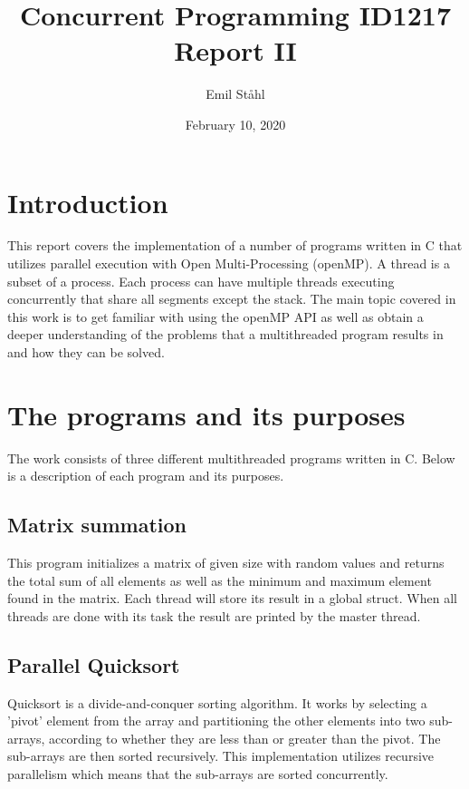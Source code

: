 \documentclass{article}
\title{\textbf{Concurrent Programming ID1217} \\ 
\textbf{Report II}}
\author{Emil Ståhl}
\date{February 10, 2020}
\begin{document}
\maketitle

\section{Introduction}

This report covers the implementation of a number of programs written in C that utilizes parallel execution with Open Multi-Processing (openMP). A thread is a subset of a process. Each process can have multiple threads executing concurrently that share all segments except the stack. The main topic covered in this work is to get familiar with using the openMP API as well as obtain a deeper understanding of the problems that a multithreaded program results in and how they can be solved. 

\section{The programs and its purposes}

The work consists of three different multithreaded programs written in C. Below is a description of each program and its purposes.  

\subsection{Matrix summation}

This program initializes a matrix of given size with random values and returns the total sum of all elements as well as the minimum and maximum element found in the matrix. Each thread will store its result in a global struct. When all threads are done with its task the result are printed by the master thread. 

\subsection{Parallel Quicksort}

Quicksort is a divide-and-conquer sorting algorithm. It works by selecting a 'pivot' element from the array and partitioning the other elements into two sub-arrays, according to whether they are less than or greater than the pivot. The sub-arrays are then sorted recursively. This implementation utilizes recursive parallelism which means that the sub-arrays are sorted concurrently. 
\end{document}
